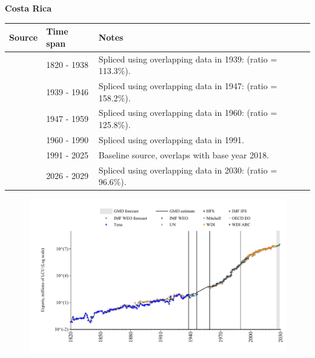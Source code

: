 \documentclass[12pt,a4paper,landscape]{article}
\begin{document}
\begin{adjustbox}{max totalsize={\paperwidth}{\paperheight},center}
\begin{minipage}[t][\textheight][t]{\textwidth}
\vspace*{0.5cm}
{}
\begin{center}
{\Large\bfseries Costa Rica}
\end{center}
\vspace{0.5cm}
\begin{table}[H]
\centering
\small
\begin{tabular}{|l|l|l|}
\hline
\textbf{Source} & \textbf{Time span} & \textbf{Notes} \\
\hline
\rowcolor{white}\cite{Tena}& 1820 - 1938 &Spliced using overlapping data in 1939: (ratio = 113.3\%).\\
\rowcolor{lightgray}\cite{HFS}& 1939 - 1946 &Spliced using overlapping data in 1947: (ratio = 158.2\%).\\
\rowcolor{white}\cite{Mitchell}& 1947 - 1959 &Spliced using overlapping data in 1960: (ratio = 125.8\%).\\
\rowcolor{lightgray}\cite{WDI}& 1960 - 1990 &Spliced using overlapping data in 1991.\\
\rowcolor{white}\cite{OECD_EO}& 1991 - 2025 &Baseline source, overlaps with base year 2018.\\
\rowcolor{lightgray}\cite{IMF_WEO_forecast}& 2026 - 2029 &Spliced using overlapping data in 2030: (ratio = 96.6\%).\\
\hline
\end{tabular}
\end{table}
\begin{figure}[H]
\centering
\includegraphics[width=\textwidth,height=0.6\textheight,keepaspectratio]{graphs/CRI_exports.pdf}
\end{figure}
\end{minipage}
\end{adjustbox}
\end{document}
